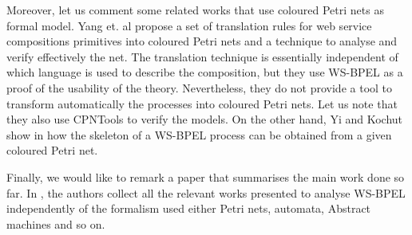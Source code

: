 Moreover, let us comment some related works that use coloured Petri nets as formal model. 
Yang et. al \cite{Yang2006} propose a set of translation rules for web service compositions primitives
into coloured Petri nets and a technique to analyse and verify
effectively the net. The translation
technique is essentially independent of which language is used to describe
the composition, but they use WS-BPEL as a proof of the usability of the theory. Nevertheless, they do not provide a tool to
transform automatically the processes into coloured Petri nets. Let us note that they also use CPNTools to verify the models.
On the other hand, Yi and Kochut show in \cite{Yi2004} how the skeleton of a WS-BPEL
process can be obtained from a given coloured Petri net. 

Finally, we would like to remark a paper that summarises the main work done so far.
In \cite{Breugel}, the authors collect all the relevant works presented to analyse WS-BPEL 
independently of the formalism used either Petri nets, automata, Abstract machines and so on.



